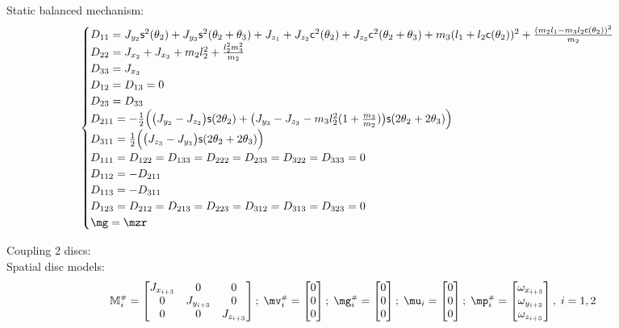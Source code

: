 \documentclass[a4paper,11pt,brazil,fleqn]{article}
\begin{document}
Static balanced mechanism:
\begin{equation}
\begin{cases}
D_{11} = J_{y_2}\ssin^2(\theta_2) + J_{y_3}\ssin^2(\theta_2+\theta_3) + J_{z_1} + J_{z_2}\ccos^2(\theta_2) + J_{z_3}\ccos^2(\theta_2+\theta_3) + m_3 (l_1 + l_2 \ccos(\theta_2))^2 + \frac{(m_2 l_1 - m_3 l_2 \ccos(\theta_2))^2}{m_2} \\
D_{22} = J_{x_2} + J_{x_3} + m_2 l_2^2 + \frac{l_2^2 m_3^2}{m_2} \\
D_{33} = J_{x_3} \\
D_{12} = D_{13} = 0 \\
D_{23} = D_{33} \\
D_{211} = -\frac{1}{2} \Big( \big( J_{y_2} - J_{z_2} \big) \ssin(2\theta_2) + \big(J_{y_3} - J_{z_3} - m_3 l_2^2 ( 1 + \frac{m_3}{m_2} )\big)\ssin(2\theta_2+2\theta_3)    \Big) \\
D_{311} = \frac{1}{2} \Big( \big(J_{z_3} - J_{y_3} \big)\ssin(2\theta_2+2\theta_3) \Big) \\
D_{111} = D_{122} = D_{133} = D_{222} = D_{233} = D_{322} = D_{333} = 0 \\
D_{112} = - D_{211} \\
D_{113} = - D_{311} \\
D_{123} = D_{212} = D_{213} = D_{223} = D_{312} = D_{313} = D_{323} = 0 \\
\mg = \mzr
\end{cases}
\end{equation}

Coupling 2 discs: \\

Spatial disc models: 
\begin{equation}
\mM\ssh_i = \begin{bmatrix} J_{x_{i+3}} & 0 & 0 \\ 0 & J_{y_{i+3}} & 0 \\ 0 & 0 & J_{z_{i+3}} \end{bmatrix}; \; \mv\ssh_i = \begin{bmatrix} 0 \\ 0 \\ 0 \end{bmatrix}; \; \mg\ssh_i = \begin{bmatrix} 0 \\ 0 \\ 0 \end{bmatrix}; \; \mu_i = \begin{bmatrix} 0 \\ 0 \\ 0  \end{bmatrix}; \; \mp\ssh_i = \begin{bmatrix} \omega_{x_{i+3}} \\ \omega_{y_{i+3}} \\ \omega_{z_{i+3}} \end{bmatrix}, \; i = 1, 2
\end{equation}
\end{document}
